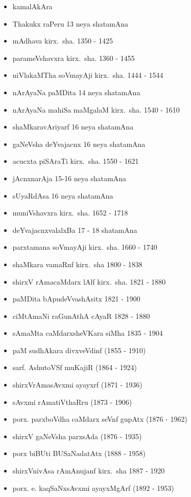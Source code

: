 {\begin{itemize}
\item kamalAkAra
\item Thakukx raPeru {\rm 13} neya shatamAna
\item mAdhava kirx.~sha. {\rm 1350 - 1425}
\item parameVshavxra kirx.~sha. {\rm 1360 - 1455}
\item niVlakaMTha soVmayAji kirx.~sha. {\rm 1444 - 1544}
\item nArAyaNa paMDita {\rm 14} neya shatamAna
\item nArAyaNa mahiSa maMgalaM kirx.~sha. {\rm 1540 - 1610}
\item shaMkaravAriyarf {\rm 16} neya shatamAna
\item gaNeVsha deYvajacnx {\rm 16} neya shatamAna
\item acucxta piSAraTi kirx.~sha. {\rm 1550 - 1621}
\item jAcnxnarAja {\rm 15-16} neya shatamAna
\item sUyaRdAsa {\rm 16} neya shatamAna
\item muniVshavxra kirx.~sha. {\rm 1652 - 1718}
\item deYvajacnxvalalxBa {\rm 17 - 18} shatamAna
\item parxtamana soVmayAji kirx.~sha. {\rm 1660 - 1740}
\item shaMkara vamaRnf kirx.~sha {\rm 1800 - 1838}
\item shirxV rAmacaMdarx lAlf kirx.~sha. {\rm 1821 - 1880}
\item paMDita bApudeVvashAsitx {\rm 1821 - 1900}
\item ciMtAmaNi raGunAthA cAyaR {\rm 1828 - 1880}
\item sAmaMta caMdarxsheVKara siMha {\rm 1835 - 1904}
\item paM sudhAkara divxveVdinf {\rm (1855 - 1910)}
\item sarf. AshutoVSf muKajiR {\rm (1864 - 1924)}
\item shirxVrAmasAvxmi ayayxrf {\rm (1871 - 1936)}
\item sAvxmi rAmatiVthaRru {\rm (1873 - 1906)}
\item porx. parxboVdha caMdarx seVnf gupAtx {\rm (1876 - 1962)}
\item shirxV gaNeVsha parxsAda {\rm (1876 - 1935)}
\item porx biBUti BUSaNadatAtx {\rm (1888 - 1958)}
\item shirxVnivAsa rAmAnujanf kirx.~sha {\rm 1887 - 1920}
\item porx. e. kaqSaNxsAvxmi ayayxMgArf {\rm (1892 - 1953)}

\end{itemize}}
